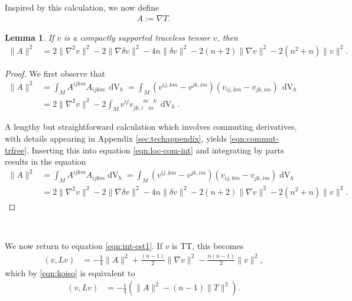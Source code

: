 \documentclass[10pt,reqno]{amsart}
\newtheorem{lemma}[theorem]{Lemma}
\DeclareMathOperator{\dvol}{dV}
\newcommand{\vdddudu}[6]{v_{#1#2,#3\phantom{#4}#5\phantom{#6}}^{\phantom{#1#2,#3}#4\phantom{#5}#6}}
\begin{document}
Inspired by this calculation, we now define
\begin{align}
\label{def:4-tensorA}
A := \nabla T. 
\end{align} 
\begin{lemma} If $v$ is a compactly supported traceless tensor $v$, then
\begin{align*}
\|A\|^2 &=  2 \| \nabla^2 v \|^2 - 2 \| \nabla \delta v\|^2 - 4 n \| \delta v\|^2 - 2(n+2) \|\nabla v\|^2  -2 (n^2 + n) \|v\|^2.
\end{align*}
\end{lemma}
\begin{proof}
We first observe that
\begin{align} \label{eqn:loc-com-int}
\|A\|^2 &= \int_{M} A^{ijkm } A_{ijkm} \, \dvol_h = \int_{M} (v^{ij,km} - v^{jk,im})(v_{ij,km} - v_{j k,im}) \, \dvol_h \nonumber \\
&= 2 \| \nabla^2 v \|^2 - 2 \int_{M} v^{ij} \vdddudu{j}{k}{i}{m}{m}{k} \, \dvol_h .
\end{align}

A lengthy but straightforward calculation which involves commuting derivatives, with details appearing in Appendix \ref{sec:techappendix}, 
yields \eqref{eqn:commut-trfree}. Inserting this into equation \eqref{eqn:loc-com-int} and integrating by parts results in the equation
\begin{align*} 
\|A\|^2 &= \int_{M} A^{ijkm } A_{ijkm} \dvol_h = \int_{M} (v^{ij,km} - v^{jk,im})(v_{ij,km} - v_{j k,im}) \dvol_h \nonumber \\
&=  2 \| \nabla^2 v \|^2 - 2 \| \nabla \delta v\|^2 - 4 n \| \delta v\|^2 - 2(n+2) \|\nabla v\|^2  -2 (n^2 + n) \|v\|^2.
\end{align*}
\end{proof}

\

We now return to equation \eqref{eqn:int-est1}. If $v$ is TT, this becomes
\begin{align} \label{eqn:spec-est-0}
(v, Lv)  &= -\frac{1}{4} \| A \|^2 + \frac{(n-1)}{2} \|\nabla v\|^2 - \frac{n(n-1)}{2} \|v\|^2,
\end{align}
which by \eqref{eqn:koiso} is equivalent to
\begin{align} \label{eqn:spec-est-AT}
(v, Lv) 
&= -\frac{1}{4} ( \|A\|^2 - (n-1) \|T\|^2) .
\end{align}

\ 
\end{document}
